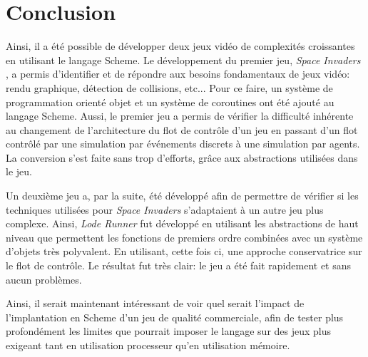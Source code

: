 \documentclass[12pt,oneside,letterpaper,francais]{book}
\newcommand{\lr}{{\textit{Lode Runner }}}
\newcommand{\si}{{\textit{Space Invaders }}}
\begin{document}
\section{Conclusion}
Ainsi, il a été possible de développer deux jeux vidéo de complexités
croissantes en utilisant le langage Scheme. Le développement du
premier jeu, \si, a permis d'identifier et de répondre aux besoins
fondamentaux de jeux vidéo: rendu graphique, détection de collisions,
etc... Pour ce faire, un système de programmation orienté objet et un
système de coroutines ont été ajouté au langage Scheme. Aussi, le
premier jeu a permis de vérifier la difficulté inhérente au changement
de l'architecture du flot de contrôle d'un jeu en passant d'un flot
contrôlé par une simulation par événements discrets à une simulation
par agents. La conversion s'est faite sans trop d'efforts, grâce aux
abstractions utilisées dans le jeu.

Un deuxième jeu a, par la suite, été développé afin de permettre de
vérifier si les techniques utilisées pour \si s'adaptaient à un autre
jeu plus complexe. Ainsi, \lr fut développé en utilisant les
abstractions de haut niveau que permettent les fonctions de premiers
ordre combinées avec un système d'objets très polyvalent. En
utilisant, cette fois ci, une approche conservatrice sur le flot de
contrôle. Le résultat fut très clair: le jeu a été fait rapidement et
sans aucun problèmes. 

Ainsi, il serait maintenant intéressant de voir quel serait l'impact
de l'implantation en Scheme d'un jeu de qualité commerciale, afin de
tester plus profondément les limites que pourrait imposer le langage
sur des jeux plus exigeant tant en utilisation processeur qu'en
utilisation mémoire.
\end{document}

